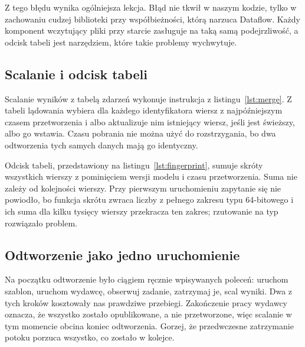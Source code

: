 Z tego błędu wynika ogólniejsza lekcja.
Błąd nie tkwił w naszym kodzie, tylko w zachowaniu cudzej biblioteki przy współbieżności, którą narzuca Dataflow.
Każdy komponent wczytujący pliki przy starcie zasługuje na taką samą podejrzliwość, a odcisk tabeli jest narzędziem, które takie problemy wychwytuje.

\subsection{Scalanie i odcisk tabeli}
\label{sec:impl-merge}

Scalanie wyników z tabelą zdarzeń wykonuje instrukcja z listingu~\ref{lst:merge}.
Z tabeli lądowania wybiera dla każdego identyfikatora wiersz z najpóźniejszym czasem przetworzenia i albo aktualizuje nim istniejący wiersz, jeśli jest świeższy, albo go wstawia.
Czasu pobrania nie można użyć do rozstrzygania, bo dwa odtworzenia tych samych danych mają go identyczny.



Odcisk tabeli, przedstawiony na listingu~\ref{lst:fingerprint}, sumuje skróty wszystkich wierszy z pominięciem wersji modelu i czasu przetworzenia.
Suma nie zależy od kolejności wierszy.
Przy pierwszym uruchomieniu zapytanie się nie powiodło, bo funkcja skrótu zwraca liczby z pełnego zakresu typu 64-bitowego i ich suma dla kilku tysięcy wierszy przekracza ten zakres; rzutowanie na typ  rozwiązało problem.



\subsection{Odtworzenie jako jedno uruchomienie}
\label{sec:impl-replay-build}

Na początku odtworzenie było ciągiem ręcznie wpisywanych poleceń: uruchom szablon, uruchom wydawcę, obserwuj zadanie, zatrzymaj je, scal wyniki.
Dwa z tych kroków kosztowały nas prawdziwe przebiegi.
Zakończenie pracy wydawcy oznacza, że wszystko zostało opublikowane, a nie przetworzone, więc scalanie w tym momencie obcina koniec odtworzenia.
Gorzej, że przedwczesne zatrzymanie potoku porzuca wszystko, co zostało w kolejce.

